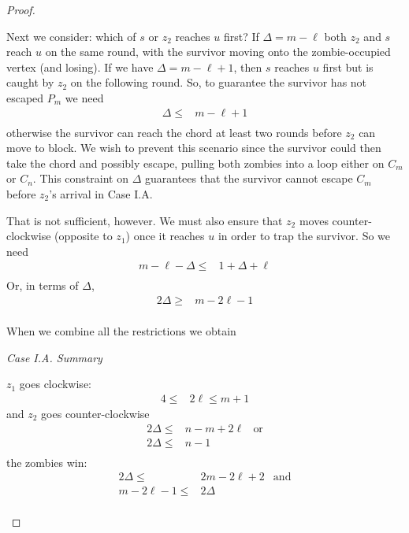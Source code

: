 \begin{proof}
\begin{proofpart}
  Next we consider: which of $s$ or $z_2$ reaches $u$ first?
  If $\Delta = m - \ell$ both $z_2$ and $s$ reach $u$ on the same round,
  with the survivor moving onto the zombie-occupied vertex (and losing).
  If we have $\Delta = m - \ell + 1$, then $s$ reaches $u$ first
  but is caught by $z_2$ on the following round.
  So, to guarantee the survivor has not escaped $P_m$ we need
  \begin{align*}
   \Delta \leq & m- \ell + 1 \\
  \end{align*}
  otherwise the survivor can reach the chord at least two rounds
  before $z_2$ can move to block. We wish to prevent this scenario since
  the survivor could then take the chord and possibly escape, pulling
  both zombies into a loop either on $C_{m}$ or $C_{n}$.
  This constraint on $\Delta$ guarantees that the survivor cannot
  escape $C_m$ before $z_2$'s arrival in Case I.A.

  That is not sufficient, however. We must also ensure that $z_2$ moves
  counter-clockwise (opposite to $z_1$) once it reaches $u$ in order to trap the
  survivor. So we need
  \begin{align*}
   m - \ell - \Delta \leq & 1 + \Delta + \ell \\
\end{align*}
Or, in terms of $\Delta$,
\begin{align*}
   2 \Delta \geq          & m - 2\ell  -1     \\
  \end{align*}

  When we combine all the restrictions we obtain

  \textit{Case I.A. Summary}

  $z_1$ goes clockwise:
  \begin{align*}
   4 \leq & 2 \ell \leq m + 1
  \end{align*}
  and $z_2$ goes counter-clockwise
  \begin{align*}
   2 \Delta \leq & n - m + 2\ell & \text{or} \\
   2 \Delta \leq & n - 1                     \\
  \end{align*}
  the zombies win:
  \begin{align*}
   2 \Delta \leq      & 2 m- 2 \ell + 2 & \text{and} \\
   m - 2\ell  -1 \leq & 2 \Delta                     \\
  \end{align*}


\end{proofpart}
\end{proof}
